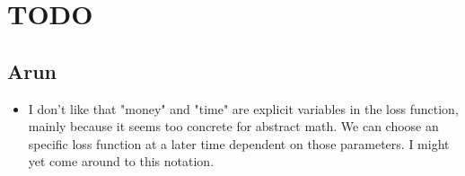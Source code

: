 \section{TODO}

\subsection{Arun}

\begin{itemize}
  \item I don't like that "money" and "time" are explicit variables in the loss function, mainly because it seems too concrete for abstract math. We can choose an specific loss function at a later time dependent on those parameters. I might yet come around to this notation.
\end{itemize}
